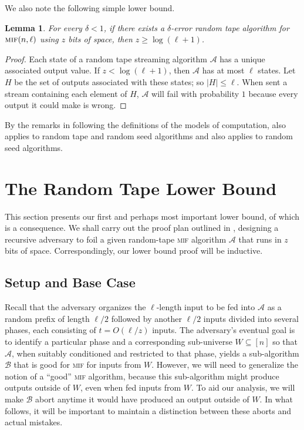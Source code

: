 \documentclass[10pt,a4paper]{article}
\newtheorem{lemma}[theorem]{Lemma}
\theoremstyle{definition}
\theoremstyle{remark}
\newcommand{\cA}{\mathcal{A}}
\newcommand{\cB}{\mathcal{B}}
\newcommand{\mif}{\textsc{mif}\xspace}
\newcommand{\rl}{\mathbf{\ell}}             %
\begin{document}
\begin{itemize}
\begin{itemize}
We also note the following simple lower bound.

\begin{lemma}\label{lem:rt-triv-logr-lb}
  For every $\delta < 1$, if there exists a $\delta$-error random tape
  algorithm for $\mif(n,\rl)$ using $z$ bits of space, then $z \ge
  \log(\rl+1)$.
\end{lemma}
\begin{proof}
  Each state of a random tape streaming algorithm $\cA$ has a unique
  associated output value. If $z < \log(\rl + 1)$, then $\cA$ has at most
  $\rl$ states. Let $H$ be the set of outputs associated with these states; so
  $|H| \le \rl$. When sent a stream containing each element of $H$, $\cA$ will
  fail with probability $1$ because every output it could make is wrong.
\end{proof}

By the remarks in  following the definitions of the models of
computation,  also applies to random tape and random
seed algorithms and  also applies to random seed
algorithms.

\section{The Random Tape Lower Bound}\label{sec:rt-lb}

This section presents our first and perhaps most important lower bound, of
which  is a consequence. We shall carry out the proof plan
outlined in , designing a recursive adversary to
foil a given random-tape \mif algorithm $\cA$ that runs in $z$ bits of space.
Correspondingly, our lower bound proof will be inductive.

\subsection{Setup and Base Case}

Recall that the adversary organizes the $\rl$-length input to be fed into
$\cA$ as a random prefix of length $\rl/2$ followed by another $\rl/2$ inputs
divided into several phases, each consisting of $t = O(\rl/z)$ inputs. The
adversary's eventual goal is to identify a particular phase and a
corresponding sub-universe $W \subseteq [n]$ so that $\cA$, when suitably
conditioned and restricted to that phase, yields a sub-algorithm $\cB$ that is
good for \mif for inputs from $W$. However, we will need to generalize the notion of a
``good'' \mif algorithm, because this sub-algorithm might produce outputs outside of $W$,
even when fed inputs from $W$. To aid our analysis, we will make $\cB$ abort
anytime it would have produced an output outside of $W$. In what follows, it
will be important to maintain a distinction between these aborts and actual
mistakes.


\end{itemize}
\end{itemize}
\end{document}

